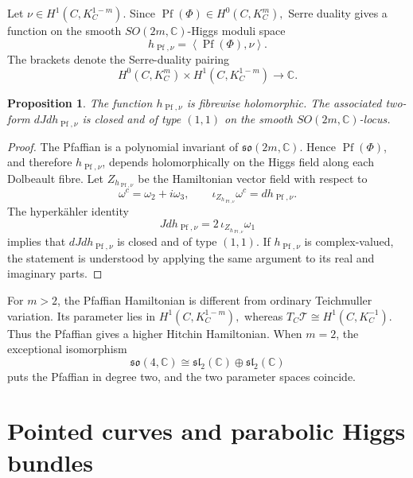 \documentclass[11pt,reqno]{amsart}
\numberwithin{equation}{section}
\theoremstyle{plain}
\newtheorem{proposition}[theorem]{Proposition}
\theoremstyle{definition}
\theoremstyle{remark}
\begin{document}
Let
\(
        \nu\in H^1(C,K_C^{1-m}).
\)
Since
\(
        \operatorname{Pf}(\Phi)\in H^0(C,K_C^m),
\)
Serre duality gives a function on the smooth \(SO(2m,\mathbb C)\)-Higgs moduli
space
\[
        h_{\operatorname{Pf},\nu}
        =
        \left\langle
        \operatorname{Pf}(\Phi),\nu
        \right\rangle .
\]
The brackets denote the Serre-duality pairing
\[
        H^0(C,K_C^m)\times H^1(C,K_C^{1-m})
        \longrightarrow \mathbb C .
\]

\begin{proposition}
\label{prop:pfaffian-compact}
The function \(h_{\operatorname{Pf},\nu}\) is fibrewise holomorphic.  The
associated two-form
\(
        dJdh_{\operatorname{Pf},\nu}
\)
is closed and of type \((1,1)\) on the smooth \(SO(2m,\mathbb C)\)-locus.
\end{proposition}
\begin{proof}
The Pfaffian is a polynomial invariant of \(\mathfrak{so}(2m,\mathbb C)\). Hence \(\operatorname{Pf}(\Phi)\), and therefore
\(h_{\operatorname{Pf},\nu}\), depends holomorphically on the Higgs field along
each Dolbeault fibre. Let \(Z_{h_{\operatorname{Pf},\nu}}\) be the Hamiltonian vector field with
respect to
\[
        \omega^c=\omega_2+i\omega_3,
        \qquad
        \iota_{Z_{h_{\operatorname{Pf},\nu}}}\omega^c
        =
        dh_{\operatorname{Pf},\nu}.
\]
The hyperk\"ahler identity
\[
        Jdh_{\operatorname{Pf},\nu}
        =
        2\,\iota_{Z_{h_{\operatorname{Pf},\nu}}}\omega_1
\]
implies that
\(
        dJdh_{\operatorname{Pf},\nu}
\)
is closed and of type \((1,1)\).  If \(h_{\operatorname{Pf},\nu}\) is
complex-valued, the statement is understood by applying the same argument to
its real and imaginary parts.
\end{proof}

For \(m>2\), the Pfaffian Hamiltonian is different from ordinary Teichmuller
variation.  Its parameter lies in
\(
        H^1(C,K_C^{1-m}),
\)
whereas
\(
        T_C\mathcal T\cong H^1(C,K_C^{-1}).
\)
Thus the Pfaffian gives a higher Hitchin Hamiltonian.  When \(m=2\), the
exceptional isomorphism
\[
        \mathfrak{so}(4,\mathbb C)
        \cong
        \mathfrak{sl}_2(\mathbb C)\oplus\mathfrak{sl}_2(\mathbb C)
\]
puts the Pfaffian in degree two, and the two parameter spaces coincide.

\section{Pointed curves and parabolic Higgs bundles}
\label{sec:prelim}
\end{document}
